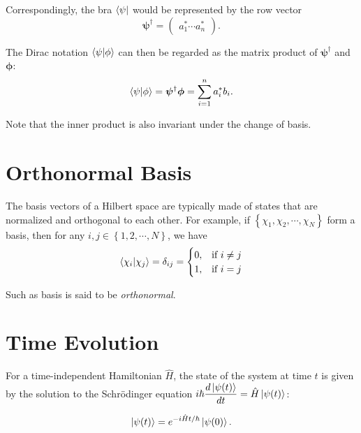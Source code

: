 \documentclass[class=report,crop=false]{standalone}
\begin{document}
Correspondingly, the bra $\bra{\psi}$ would be represented by the row vector
\begin{equation}
    \bm{\psi}^{\dagger} = \begin{pmatrix} a_1^* \cdots a_n^* \end{pmatrix}.
\end{equation}

The Dirac notation $\braket{\psi|\phi}$ can then be regarded as the matrix product of $\bm{\psi}^{\dagger}$ and $\bm{\phi}$:
\begin{equation}
    \braket{\psi|\phi} = \bm{\psi}^{\dagger}\bm{\phi} = \sum\limits_{i = 1}^{n} a_i^* b_i.
\end{equation}

Note that the inner product is also invariant under the change of basis.

\section*{Orthonormal Basis}
\addtocounter{section}{1}
\setcounter{equation}{0}

The basis vectors of a Hilbert space are typically made of states that are normalized and orthogonal to each other. For example, if $\left\{ \chi_1, \chi_2, \cdots, \chi_N \right\}$ form a basis, then for any $i, j \in \left\{ 1, 2, \cdots, N \right\}$, we have
\begin{equation}
    \braket{\chi_i | \chi_j} = \delta_{ij} = \begin{cases} \displaystyle 0, & \text{if } i \neq j \\ \displaystyle 1, & \text{if } i = j \end{cases}
\end{equation}

Such as basis is said to be \emph{orthonormal}.

\section*{Time Evolution}
\addtocounter{section}{1}
\setcounter{equation}{0}

For a \colorbox{REDE}{time-independent} Hamiltonian $\hat{H}$, the state of the system at time $t$ is given by the solution to the Schr{\"o}dinger equation $\displaystyle i\hbar \frac{d \ket{\psi(t)}}{dt} = \hat{H} \ket{\psi(t)}$:

\begin{equation}
    \Ket{\psi(t)} = e^{-i\hat{H}t / \hbar} \ket{\psi(0)}.
\end{equation}
\end{document}
